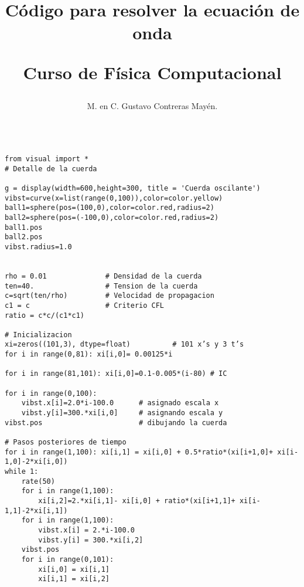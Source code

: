 \documentclass[12pt]{article}
\author{M. en C. Gustavo Contreras Mayén.}
\title{Código para resolver la ecuación de onda \\ \begin{Large}Curso de Fí­sica Computacional\end{Large}}
\date{ }
\numberwithin{equation}{section}
\begin{document}
\maketitle
\begin{lstlisting}

from visual import *
# Detalle de la cuerda

g = display(width=600,height=300, title = 'Cuerda oscilante')
vibst=curve(x=list(range(0,100)),color=color.yellow)
ball1=sphere(pos=(100,0),color=color.red,radius=2)
ball2=sphere(pos=(-100,0),color=color.red,radius=2)
ball1.pos
ball2.pos
vibst.radius=1.0


rho = 0.01              # Densidad de la cuerda
ten=40.                 # Tension de la cuerda
c=sqrt(ten/rho)         # Velocidad de propagacion
c1 = c                  # Criterio CFL
ratio = c*c/(c1*c1)

# Inicializacion
xi=zeros((101,3), dtype=float)          # 101 x’s y 3 t’s
for i in range(0,81): xi[i,0]= 0.00125*i

for i in range(81,101): xi[i,0]=0.1-0.005*(i-80) # IC

for i in range(0,100):
    vibst.x[i]=2.0*i-100.0      # asignado escala x
    vibst.y[i]=300.*xi[i,0]     # asignando escala y
vibst.pos                       # dibujando la cuerda

# Pasos posteriores de tiempo
for i in range(1,100): xi[i,1] = xi[i,0] + 0.5*ratio*(xi[i+1,0]+ xi[i-1,0]-2*xi[i,0])
while 1:
    rate(50)
    for i in range(1,100):
        xi[i,2]=2.*xi[i,1]- xi[i,0] + ratio*(xi[i+1,1]+ xi[i-1,1]-2*xi[i,1])
    for i in range(1,100):
        vibst.x[i] = 2.*i-100.0
        vibst.y[i] = 300.*xi[i,2]
    vibst.pos
    for i in range(0,101):
        xi[i,0] = xi[i,1]
        xi[i,1] = xi[i,2]
\end{lstlisting}
\end{document}
